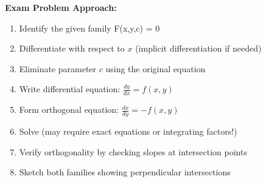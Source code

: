 \documentclass[12pt]{article}
\begin{document}
\begin{algorithm}
\textbf{Exam Problem Approach:}
\begin{enumerate}
    \item Identify the given family F(x,y,c) = 0
    \item Differentiate with respect to $x$ (implicit differentiation if needed)
    \item Eliminate parameter $c$ using the original equation
    \item Write differential equation: $\frac{dy}{dx} = f(x,y)$
    \item Form orthogonal equation: $\frac{dx}{dy} = -f(x,y)$
    \item Solve (may require exact equations or integrating factors!)
    \item Verify orthogonality by checking slopes at intersection points
    \item Sketch both families showing perpendicular intersections
\end{enumerate}
\end{algorithm}
\end{document}
